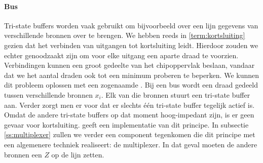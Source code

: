 \paragraph{Bus}Tri-state buffers worden vaak gebruikt om bijvoorbeeld over een lijn gegevens van verschillende bronnen over te brengen. We hebben reeds in \ref{term:kortsluiting} gezien dat het verbinden van uitgangen tot kortsluiting leidt. Hierdoor zouden we echter genoodzaakt zijn om voor elke uitgang een aparte draad te voorzien. Verbindingen kunnen een groot gedeelte van het chipoppervlak beslaan, vandaar dat we het aantal draden ook tot een minimum proberen te beperken. We kunnen dit probleem oplossen met een zogenaamde . Bij een bus wordt een draad gedeeld tussen verschillende bronnen $x_i$. Elk van die bronnen stuurt een tri-state buffer aan. Verder zorgt men er voor dat er slechts \'e\'en tri-state buffer tegelijk actief is. Omdat de andere tri-state buffers op dat moment hoog-impedant zijn, is er geen gevaar voor kortsluiting.  geeft een implementatie van dit principe. In subsectie \ref{ss:multiplexer} zullen we verder een component tegenkomen die dit principe met een algemenere techniek realiseert: de multiplexer. In dat geval moeten de andere bronnen een $Z$ op de lijn zetten.
